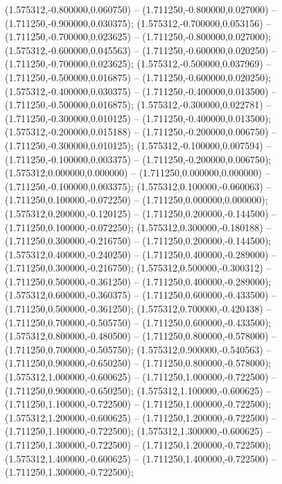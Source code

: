  (1.575312,-0.800000,0.060750) -- (1.711250,-0.800000,0.027000) -- (1.711250,-0.900000,0.030375);
 (1.575312,-0.700000,0.053156) -- (1.711250,-0.700000,0.023625) -- (1.711250,-0.800000,0.027000);
 (1.575312,-0.600000,0.045563) -- (1.711250,-0.600000,0.020250) -- (1.711250,-0.700000,0.023625);
 (1.575312,-0.500000,0.037969) -- (1.711250,-0.500000,0.016875) -- (1.711250,-0.600000,0.020250);
 (1.575312,-0.400000,0.030375) -- (1.711250,-0.400000,0.013500) -- (1.711250,-0.500000,0.016875);
 (1.575312,-0.300000,0.022781) -- (1.711250,-0.300000,0.010125) -- (1.711250,-0.400000,0.013500);
 (1.575312,-0.200000,0.015188) -- (1.711250,-0.200000,0.006750) -- (1.711250,-0.300000,0.010125);
 (1.575312,-0.100000,0.007594) -- (1.711250,-0.100000,0.003375) -- (1.711250,-0.200000,0.006750);
 (1.575312,0.000000,0.000000) -- (1.711250,0.000000,0.000000) -- (1.711250,-0.100000,0.003375);
 (1.575312,0.100000,-0.060063) -- (1.711250,0.100000,-0.072250) -- (1.711250,0.000000,0.000000);
 (1.575312,0.200000,-0.120125) -- (1.711250,0.200000,-0.144500) -- (1.711250,0.100000,-0.072250);
 (1.575312,0.300000,-0.180188) -- (1.711250,0.300000,-0.216750) -- (1.711250,0.200000,-0.144500);
 (1.575312,0.400000,-0.240250) -- (1.711250,0.400000,-0.289000) -- (1.711250,0.300000,-0.216750);
 (1.575312,0.500000,-0.300312) -- (1.711250,0.500000,-0.361250) -- (1.711250,0.400000,-0.289000);
 (1.575312,0.600000,-0.360375) -- (1.711250,0.600000,-0.433500) -- (1.711250,0.500000,-0.361250);
 (1.575312,0.700000,-0.420438) -- (1.711250,0.700000,-0.505750) -- (1.711250,0.600000,-0.433500);
 (1.575312,0.800000,-0.480500) -- (1.711250,0.800000,-0.578000) -- (1.711250,0.700000,-0.505750);
 (1.575312,0.900000,-0.540563) -- (1.711250,0.900000,-0.650250) -- (1.711250,0.800000,-0.578000);
 (1.575312,1.000000,-0.600625) -- (1.711250,1.000000,-0.722500) -- (1.711250,0.900000,-0.650250);
 (1.575312,1.100000,-0.600625) -- (1.711250,1.100000,-0.722500) -- (1.711250,1.000000,-0.722500);
 (1.575312,1.200000,-0.600625) -- (1.711250,1.200000,-0.722500) -- (1.711250,1.100000,-0.722500);
 (1.575312,1.300000,-0.600625) -- (1.711250,1.300000,-0.722500) -- (1.711250,1.200000,-0.722500);
 (1.575312,1.400000,-0.600625) -- (1.711250,1.400000,-0.722500) -- (1.711250,1.300000,-0.722500);
